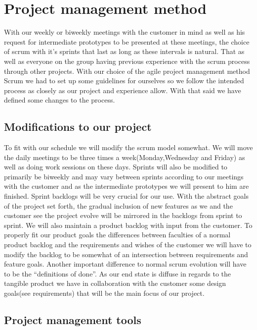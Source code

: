 \section{Project management method}


With our weekly or biweekly meetings with the customer in mind as well as his request for intermediate prototypes to be presented at these meetings, the choice of scrum with it’s sprints that last as long as these intervals is natural. That as well as everyone on the group having previous experience with the scrum process through other projects.
With our choice of the agile project management method Scrum we had to set up some guidelines for ourselves so we follow the intended process as closely as our project and experience allow. With that said we have defined some changes to the process.


\subsection{Modifications to our project}

To fit with our schedule we will modify the scrum model somewhat. We will move the daily meetings to be three times a week(Monday,Wednesday and Friday) as well as doing work sessions on these days. Sprints will also be modified to primarily be biweekly and may vary between sprints according to our meetings with the customer and as the intermediate prototypes we will present to him are finished. Sprint backlogs will be very crucial for our use. With the abstract goals of the project set forth, the gradual inclusion of new features as we and the customer see the project evolve will be mirrored in the backlogs from sprint to sprint. We will also maintain a product backlog with input from the customer. To properly fit our product goals the differences between faculties of a normal product backlog and the requirements and wishes of the customer we will have to modify the backlog to be somewhat of an intersection between requirements and feature goals. Another important difference to normal scrum evolution will have to be the “definitions of done”. As our end state is diffuse in regards to the tangible product we have in collaboration with the customer some design goals(see requirements) that will be the main focus of our project.


\subsection{Project management tools}


